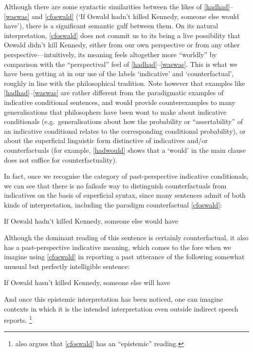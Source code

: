 \documentclass[If.tex]{subfiles}
\begin{document}
Although there are some syntactic similarities between the likes of \ref{hadhad}--\ref{waswas} and \ref{cfoswald} (‘If Oswald hadn't killed Kennedy, someone else would have’), there is a significant semantic gulf between them. On its natural interpretation, \ref{cfoswald} does not commit us to its being a live possibility that Oswald didn't kill Kennedy, either from our own perspective or from any other perspective---intuitively, its meaning feels altogether more “worldly” by comparison with the “perspectival” feel of \ref{hadhad}--\ref{waswas}. This is what we have been getting at in our use of the labels ‘indicative’ and ‘counterfactual’, roughly in line with the philosophical tradition.  Note however that examples like \ref{hadhad}--\ref{waswas} are rather different from the paradigmatic examples of indicative conditional sentences, and would provide counterexamples to many generalisations that philosophers have been wont to make about indicative conditionals (e.g.~generalisations about how the probability or “assertability” of an indicative conditional relates to the corresponding conditional probability), or about the superficial linguistic form distinctive of indicatives and/or counterfactuals (for example, \ref{hadwould} shows that a ‘would’ in the main clause does not suffice for counterfactuality).

In fact, once we recognise the category of past-perspective indicative conditionals, we can see that there is no failsafe way to distinguish counterfactuals from indicatives on the basis of superficial syntax, since many sentences admit of both kinds of interpretation, including the paradigm counterfactual \ref{cfoswald}:
\begin{prop}
	\sitem[\ref*{cfoswald}]
	If Oswald hadn't killed Kennedy, someone else would have 
\end{prop}
Although the dominant reading of this sentence is certainly counterfactual, it also has a past-perspective indicative meaning, which comes to the fore when we imagine using \ref{cfoswald} in reporting a past utterance of the following somewhat unusual but perfectly intelligible sentence:
\begin{prop}
	\nitem %
	If Oswald hasn't killed Kennedy, someone else will have 
\end{prop}
And once this epistemic interpretation has been noticed, one can imagine contexts in which it is the intended interpretation even outside indirect speech reports.%
\footnote{\citet[p.\ 15]{KhooISC} also argues that \ref{cfoswald} has an “epistemic” reading.}
\end{document}
